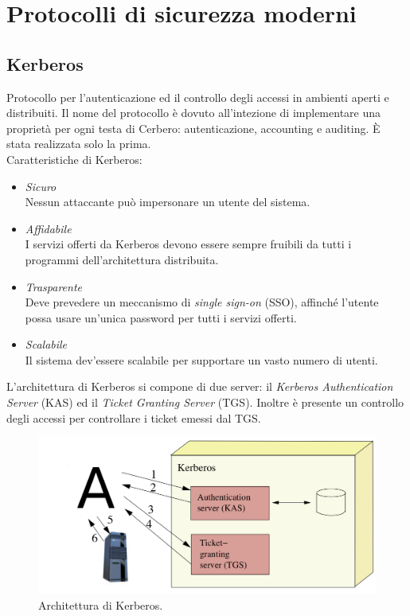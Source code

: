 \documentclass[a4paper, 11pt, notitlepage, fleqn]{report}
\begin{document}
\chapter{Protocolli di sicurezza moderni}
\section{Kerberos}
Protocollo per l'autenticazione ed il controllo degli accessi in ambienti aperti e distribuiti. Il nome del protocollo è dovuto all'intezione di implementare una proprietà per ogni testa di Cerbero: autenticazione, accounting e auditing. \`E stata realizzata solo la prima.\\
Caratteristiche di Kerberos:
\begin{itemize}
	\item \emph{Sicuro}\\
	Nessun attaccante può impersonare un utente del sistema.
	\item \emph{Affidabile}\\
	I servizi offerti da Kerberos devono essere sempre fruibili da tutti i programmi dell'architettura distribuita.
	\item \emph{Trasparente}\\
	Deve prevedere un meccanismo di \emph{single sign-on} (SSO), affinché l'utente possa usare un'unica password per tutti i servizi offerti.
	\item \emph{Scalabile}\\
	Il sistema dev'essere scalabile per supportare un vasto numero di utenti.
\end{itemize}
L'architettura di Kerberos si compone di due server: il \emph{Kerberos Authentication Server} (KAS) ed il \emph{Ticket Granting Server} (TGS). Inoltre è presente un controllo degli accessi per controllare i ticket emessi dal TGS.

\begin{figure}[htp]
	\centering
	\includegraphics[width=.9\textwidth]{images/kerberos}
	\caption{Architettura di Kerberos.}
\end{figure}
\end{document}
